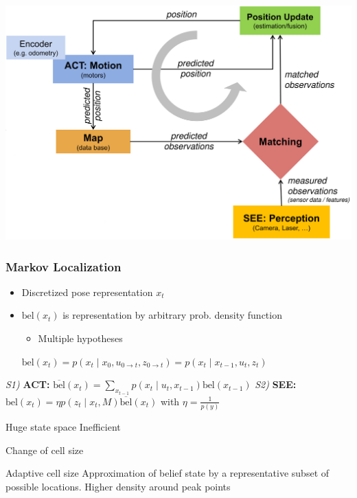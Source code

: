 \includegraphics[width=\linewidth]{./Figures/05_LocalisationCycle.png}

\subsubsection{Markov Localization}
\begin{itemize}
    \item Discretized pose representation $x_t$
    \item $\text{bel}(x_t)$ is representation by arbitrary prob. density function
        \begin{itemize}
            \item Multiple hypotheses
        \end{itemize}
     $\text{bel}(x_t) = p(x_t \mid x_0, u_{0 \to t}, z_{0 \to t}) = p(x_t \mid x_{t - 1}, u_t, z_t)$
\end{itemize}
\begin{algorithmic}
        \STATE \textit{S1)} \textbf{ACT:} $\overline{\text{bel}}(x_t) = \sum_{x_{t-1}} p(x_t \mid u_t, x_{t - 1}) \text{bel}(x_{t-1})$
        \STATE \textit{S2)} \textbf{SEE:} $\text{bel}(x_t) = \eta p(z_t \mid x_t, M) \overline{\text{bel}}(x_t)$ with $\eta = \frac{1}{p(y)}$
    \ENDFOR
\end{algorithmic}
\begin{itemize}
    \icon Huge state space
    \icon Inefficient
        \begin{itemize*}
            \item Change of cell size
            \item Adaptive cell size
             Approximation of belief state by a representative subset of possible locations. Higher density around peak points
        \end{itemize*}
\end{itemize}

